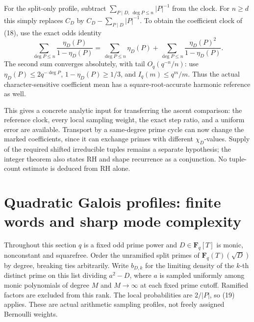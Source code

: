 \documentclass[11pt]{article}
\newcommand{\F}{\mathbf F}
\begin{document}
For the split-only profile, subtract
\(\sum_{P\mid D,\ \deg P\leq n}|P|^{-1}\) from the clock.
For \(n\geq d\) this simply replaces \(C_D\) by
\(C_D-\sum_{P\mid D}|P|^{-1}\).
To obtain the coefficient clock of (18), use the exact odds identity
\[
 \sum_{\deg P\leq n}\frac{\eta_D(P)}{1-\eta_D(P)}
  =\sum_{\deg P\leq n}\eta_D(P)
       +\sum_{\deg P\leq n}\frac{\eta_D(P)^2}{1-\eta_D(P)}.
\]
The second sum converges absolutely, with tail \(O_q(q^{-n}/n)\):
use \(\eta_D(P)\leq2q^{-\deg P}\), \(1-\eta_D(P)\geq1/3\),
and \(I_q(m)\leq q^m/m\).
Thus the actual character-sensitive coefficient mean has a
square-root-accurate harmonic reference as well.

This gives a concrete analytic input for transferring the ascent
comparison: the reference clock, every local sampling weight, the exact
step ratio, and a uniform error are available. Transport by a
same-degree prime cycle can now change the marked coefficients, since
it can exchange primes with different \(\chi_D\)-values.
Supply of the required shifted irreducible tuples remains a separate
hypothesis; the integer theorem also states RH and shape recurrence as
a conjunction. No tuple-count estimate is deduced from RH alone.

\section{Quadratic Galois profiles: finite words and sharp mode complexity}

Throughout this section \(q\) is a fixed odd prime power and
\(D\in\F_q[T]\) is monic, nonconstant and squarefree. Order the
unramified split primes of \(\F_q(T)(\sqrt D)\) by degree, breaking
ties arbitrarily. Write \(b_{D,k}\) for the limiting density of the
\(k\)-th distinct prime on this list dividing \(a^2-D\), where \(a\)
is sampled uniformly among monic polynomials of degree \(M\) and
\(M\to\infty\) at each fixed prime cutoff. Ramified factors are
excluded from this rank. The local probabilities are \(2/|P|\),
so (19) applies. These are actual arithmetic sampling profiles,
not freely assigned Bernoulli weights.
\end{document}
